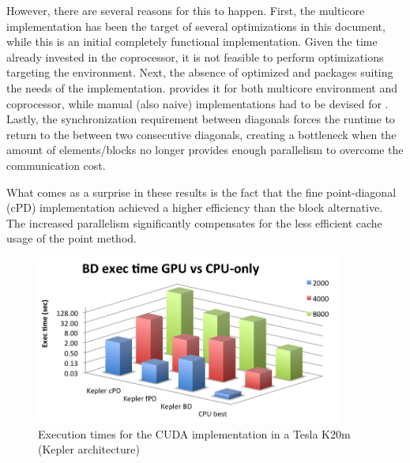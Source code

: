 \documentclass[../thesis]{subfiles}
\begin{document}
	However, there are several reasons for this to happen. First, the multicore implementation has been the target of several optimizations in this document, while this is an initial completely functional \cuda implementation. Given the time already invested in the \intel\xeonphi coprocessor, it is not feasible to perform optimizations targeting the \cuda environment. Next, the absence of optimized \blas and \lapack packages suiting the needs of the implementation. \mkl provides it for both multicore environment and coprocessor, while manual (also naive) implementations had to be devised for \cuda. Lastly, the synchronization requirement between diagonals forces the runtime to return to the \cpu between two consecutive diagonals, creating a bottleneck when the amount of elements/blocks no longer provides enough parallelism to overcome the communication cost.

	What comes as a surprise in these results is the fact that the fine point-diagonal (cPD) implementation achieved a higher efficiency than the block alternative. The increased parallelism significantly compensates for the less efficient cache usage of the point method.

	\begin{figure}[t]
		\centering
		\includegraphics[width=0.9\textwidth]{assets/images/cuda/times.png}
		\caption[Execution times for the CUDA implementation in a Tesla K20m]{Execution times for the CUDA implementation in a Tesla K20m (Kepler architecture)}
		\label{fig:cuda:results:times}
	\end{figure}
\end{document}
